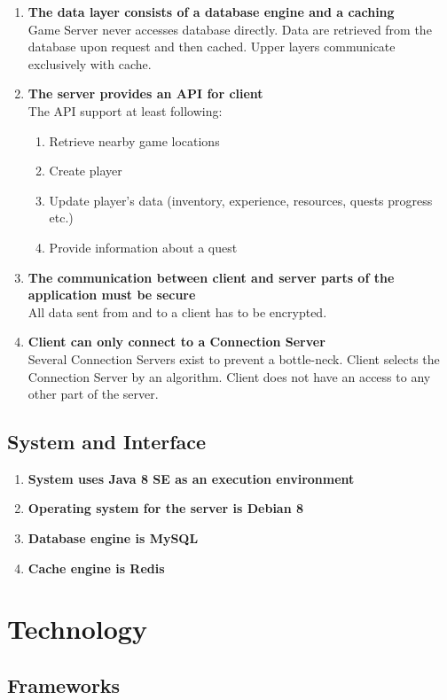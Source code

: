 		\begin{enumerate}
			\item \textbf{The data layer consists of a database engine and a caching} \\
			Game Server never accesses database directly. Data are retrieved from the database upon request and then cached. Upper layers communicate exclusively with cache.		
			
			\item \textbf{The server provides an API for client} \\
			The API support at least following:
			\begin{enumerate}
				\item Retrieve nearby game locations
				\item Create player
				\item Update player's data (inventory, experience, resources, quests progress etc.)
				\item Provide information about a quest 			
			\end{enumerate}
			
			\item \textbf{The communication between client and server parts of the application must be secure} \\
			All data sent from and to a client has to be encrypted.
	
			\item \textbf{Client can only connect to a Connection Server} \\
			Several Connection Servers exist to prevent a bottle-neck. Client selects the Connection Server by an algorithm. Client does not have an access to any other part of the server.
		\end{enumerate}
	\subsection{System and Interface}
	
		\begin{enumerate}
			\item \textbf{System uses Java 8 SE as an execution environment} \\
			
			\item \textbf{Operating system for the server is Debian 8} \\
			
			\item \textbf{Database engine is MySQL} \\
			
			\item \textbf{Cache engine is Redis} \\
		\end{enumerate}
	
\section{Technology}

	\subsection{Frameworks}
	